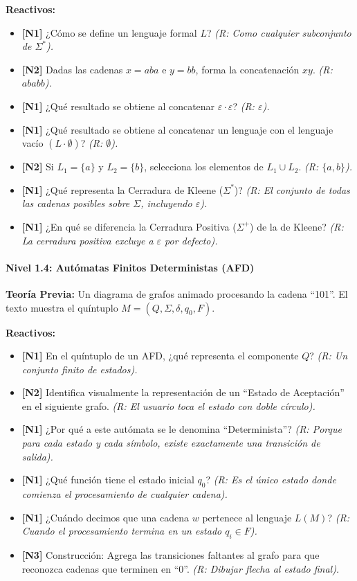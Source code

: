 \textbf{Reactivos:}
\begin{itemize}
    \item \textbf{[N1]} ¿Cómo se define un lenguaje formal $L$? \textit{(R: Como cualquier
    subconjunto de $\Sigma^*$).}
    \item \textbf{[N2]} Dadas las cadenas $x = aba$ e $y = bb$, forma la concatenación $xy$.
    \textit{(R: $ababb$).}
    \item \textbf{[N1]} ¿Qué resultado se obtiene al concatenar $\varepsilon \cdot \varepsilon$?
    \textit{(R: $\varepsilon$).}
    \item \textbf{[N1]} ¿Qué resultado se obtiene al concatenar un lenguaje con el lenguaje vacío
    $(L \cdot \emptyset)$? \textit{(R: $\emptyset$).}
    \item \textbf{[N2]} Si $L_1 = \{a\}$ y $L_2 = \{b\}$, selecciona los elementos de
    $L_1 \cup L_2$. \textit{(R: $\{a, b\}$).}
    \item \textbf{[N1]} ¿Qué representa la Cerradura de Kleene ($\Sigma^*$)? \textit{(R: El
    conjunto de todas las cadenas posibles sobre $\Sigma$, incluyendo $\varepsilon$).}
    \item \textbf{[N1]} ¿En qué se diferencia la Cerradura Positiva ($\Sigma^+$) de la de Kleene?
    \textit{(R: La cerradura positiva excluye a $\varepsilon$ por defecto).}
\end{itemize}

\paragraph{Nivel 1.4: Autómatas Finitos Deterministas (AFD)}

\textbf{Teoría Previa:} Un diagrama de grafos animado procesando la cadena ``101''. El texto
muestra el quíntuplo $M = (Q, \Sigma, \delta, q_0, F)$.

\textbf{Reactivos:}
\begin{itemize}
    \item \textbf{[N1]} En el quíntuplo de un AFD, ¿qué representa el componente $Q$? \textit{(R:
    Un conjunto finito de estados).}
    \item \textbf{[N2]} Identifica visualmente la representación de un ``Estado de Aceptación'' en
    el siguiente grafo. \textit{(R: El usuario toca el estado con doble círculo).}
    \item \textbf{[N1]} ¿Por qué a este autómata se le denomina ``Determinista''? \textit{(R:
    Porque para cada estado y cada símbolo, existe exactamente una transición de salida).}
    \item \textbf{[N1]} ¿Qué función tiene el estado inicial $q_0$? \textit{(R: Es el único estado
    donde comienza el procesamiento de cualquier cadena).}
    \item \textbf{[N1]} ¿Cuándo decimos que una cadena $w$ pertenece al lenguaje $L(M)$?
    \textit{(R: Cuando el procesamiento termina en un estado $q_i \in F$).}
    \item \textbf{[N3]} Construcción: Agrega las transiciones faltantes al grafo para que reconozca
    cadenas que terminen en ``0''. \textit{(R: Dibujar flecha al estado final).}
\end{itemize}

